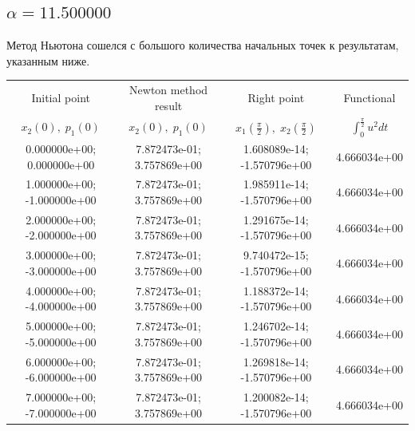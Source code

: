 \documentclass[titlepage]{article}
\def\l{\left}
\def\r{\right}
\begin{document}
\subsection{$\alpha = 11.500000$} 
Метод Ньютона сошелся с большого количества начальных точек к результатам, указанным ниже. \\ 
\begin{tabular}{ | c | c | c | c |} 
\hline 
Initial point  & Newton method result & Right point & Functional 
 \\ $x_2(0), \; p_1(0)$ & $x_2(0), \; p_1(0)$ & $x_1\l(\frac{\pi}{2}\r), \; x_2\l(\frac{\pi}{2}\r)$ & $\int_{0}^{\frac{\pi}{2}}u^2dt$  \\ \hline 
0.000000e+00; 0.000000e+00 & 7.872473e-01; 3.757869e+00 & 1.608089e-14; -1.570796e+00 & 4.666034e+00 \\ \hline 
1.000000e+00; -1.000000e+00 & 7.872473e-01; 3.757869e+00 & 1.985911e-14; -1.570796e+00 & 4.666034e+00 \\ \hline 
2.000000e+00; -2.000000e+00 & 7.872473e-01; 3.757869e+00 & 1.291675e-14; -1.570796e+00 & 4.666034e+00 \\ \hline 
3.000000e+00; -3.000000e+00 & 7.872473e-01; 3.757869e+00 & 9.740472e-15; -1.570796e+00 & 4.666034e+00 \\ \hline 
4.000000e+00; -4.000000e+00 & 7.872473e-01; 3.757869e+00 & 1.188372e-14; -1.570796e+00 & 4.666034e+00 \\ \hline 
5.000000e+00; -5.000000e+00 & 7.872473e-01; 3.757869e+00 & 1.246702e-14; -1.570796e+00 & 4.666034e+00 \\ \hline 
6.000000e+00; -6.000000e+00 & 7.872473e-01; 3.757869e+00 & 1.269818e-14; -1.570796e+00 & 4.666034e+00 \\ \hline 
7.000000e+00; -7.000000e+00 & 7.872473e-01; 3.757869e+00 & 1.200082e-14; -1.570796e+00 & 4.666034e+00 \\ \hline 
\end{tabular} 
\end{document}
